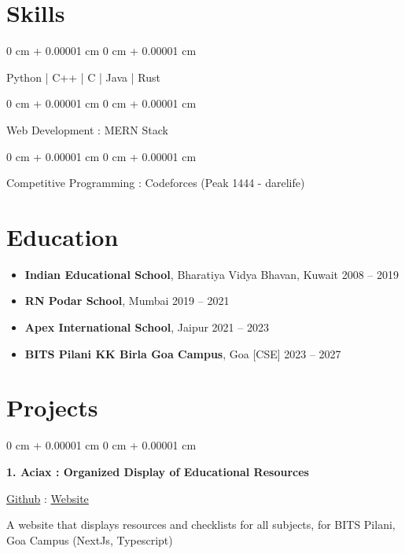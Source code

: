 \documentclass[10pt, letterpaper]{article}
\newenvironment{onecolentry}{
    \begin{adjustwidth}{
        0 cm + 0.00001 cm
    }{
        0 cm + 0.00001 cm
    }
}{
    \end{adjustwidth}
}
\newenvironment{twocolentry}[2][]{
    \onecolentry
    \def\secondColumn{#2}
    \setcolumnwidth{\fill, 4.7 cm} %
    \begin{paracol}{2}
}{
    \switchcolumn \raggedleft \secondColumn
    \end{paracol}
    \endonecolentry
}
\begin{document}
    \section{Skills}
        \begin{onecolentry}
            Python | C++ | C | Java | Rust
        \end{onecolentry}
        \vspace{0.15cm} %
        \begin{onecolentry}
            Web Development : MERN Stack
        \end{onecolentry}
        \vspace{0.15cm} %
        \begin{onecolentry}
            Competitive Programming : Codeforces (Peak 1444 - darelife)
        \end{onecolentry}

    \section{Education}
        \begin{itemize}[itemsep=0.2cm] %
            \item \textbf{Indian Educational School}, Bharatiya Vidya Bhavan, Kuwait \hfill 2008 -- 2019
            \item \textbf{RN Podar School}, Mumbai \hfill 2019 -- 2021
            \item \textbf{Apex International School}, Jaipur \hfill 2021 -- 2023
            \item \textbf{BITS Pilani KK Birla Goa Campus}, Goa [CSE] \hfill 2023 -- 2027
        \end{itemize}

    \section{Projects}
        \begin{twocolentry}{
            \href{https://github.com/Darelife/aciax}{Github} : \href{https://aciax.vercel.app/}{Website}
        }
            \textbf{1. Aciax : Organized Display of Educational Resources}
        \end{twocolentry}

        \vspace{0.15 cm} %
        A website that displays resources and checklists for all subjects, for BITS Pilani, Goa Campus (NextJs, Typescript)
\end{document}
